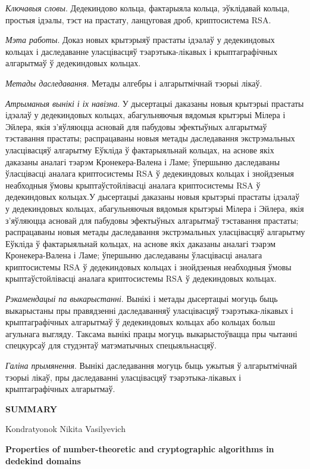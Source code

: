 \documentclass[_00_autoref.tex]{subfiles}
\begin{document}
\textit{Ключавыя словы}.
Дедекиндово кольца, фактарыяла кольца, эўклідавай кольца, простыя ідэалы, тэст на прастату, ланцуговая дроб, криптосистема RSA.

\textit{Мэта работы}.
Доказ новых крытэрыяў прастаты ідэалаў у дедекиндовых кольцах і даследаванне уласцівасцяў тэарэтыка-лікавых і крыптаграфічных алгарытмаў ў дедекиндовых кольцах.

\textit{Метады даследавання}.
Метады алгебры і алгарытмічнай тэорыі лікаў.

\textit{Атрыманыя вынікі і іх навізна}.
У дысертацыі даказаны новыя крытэрыі прастаты ідэалаў у дедекиндовых кольцах, абагульняючыя вядомыя крытэрыі Мілера і Эйлера, якія з'яўляюцца асновай для пабудовы эфектыўных алгарытмаў тэставання прастаты; распрацаваны новыя метады даследавання экстрэмальных уласцівасцяў алгарытму Еўкліда ў фактарыяльнай кольцах, на аснове якіх даказаны аналагі тэарэм Кронекера-Валена і Ламе; ўпершыню даследаваны ўласцівасці аналага криптосистемы RSA ў дедекиндовых кольцах і знойдзеныя неабходныя ўмовы крыптаўстойлівасці аналага криптосистемы RSA ў дедекиндовых кольцах.У дысертацыі даказаны новыя крытэрыі прастаты ідэалаў у дедекиндовых кольцах, абагульняючыя вядомыя крытэрыі Мілера і Эйлера, якія з'яўляюцца асновай для пабудовы эфектыўных алгарытмаў тэставання прастаты; распрацаваны новыя метады даследавання экстрэмальных уласцівасцяў алгарытму Еўкліда ў фактарыяльнай кольцах, на аснове якіх даказаны аналагі тэарэм Кронекера-Валена і Ламе; ўпершыню даследаваны ўласцівасці аналага криптосистемы RSA ў дедекиндовых кольцах і знойдзеныя неабходныя ўмовы крыптаўстойлівасці аналага криптосистемы RSA ў дедекиндовых кольцах.

\textit{Рэкамендацыі па выкарыстанні}.
Вынікі і метады дысертацыі могуць быць выкарыстаны пры правядзенні даследаванняў уласцівасцяў тэарэтыка-лікавых і крыптаграфічных алгарытмаў ў дедекиндовых кольцах або кольцах больш агульнага выгляду.
Таксама вынікі працы могуць выкарыстоўвацца пры чытанні спецкурсаў для студэнтаў матэматычных спецыяльнасцяў.

\textit{Галіна прымянення}.
Вынікі даследавання могуць быць ужытыя ў алгарытмічнай тэорыі лікаў, пры даследаванні уласцівасцяў тэарэтыка-лікавых і крыптаграфічных алгарытмаў.

\newpage
\centerline{\textbf{SUMMARY}}

\vspace{-0.3ex}
\begin{center}
Kondratyonok Nikita Vasilyevich

\textbf{Properties of number-theoretic and cryptographic algorithms in dedekind domains}
\end{center}
\vspace{-0.3ex}
\end{document}
